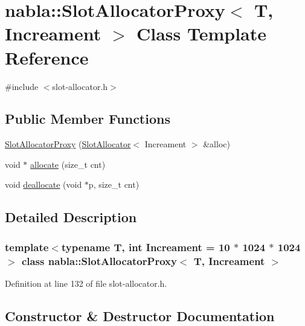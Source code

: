 \hypertarget{classnabla_1_1_slot_allocator_proxy}{}\section{nabla\+::Slot\+Allocator\+Proxy$<$ T, Increament $>$ Class Template Reference}
\label{classnabla_1_1_slot_allocator_proxy}


{\ttfamily \#include $<$slot-\/allocator.\+h$>$}

\subsection*{Public Member Functions}
\begin{DoxyCompactItemize}
\item 
\mbox{\hyperlink{classnabla_1_1_slot_allocator_proxy_ae262939587a0e89fc3df0c112b5452ef}{Slot\+Allocator\+Proxy}} (\mbox{\hyperlink{classnabla_1_1_slot_allocator}{Slot\+Allocator}}$<$ Increament $>$ \&alloc)
\item 
void $\ast$ \mbox{\hyperlink{classnabla_1_1_slot_allocator_proxy_a05daafc13137ba556aa706cda7b06547}{allocate}} (size\+\_\+t cnt)
\item 
void \mbox{\hyperlink{classnabla_1_1_slot_allocator_proxy_aea1e0a1bb27b9ca2130979566a4b4021}{deallocate}} (void $\ast$p, size\+\_\+t cnt)
\end{DoxyCompactItemize}


\subsection{Detailed Description}
\subsubsection*{template$<$typename T, int Increament = 10 $\ast$ 1024 $\ast$ 1024$>$\newline
class nabla\+::\+Slot\+Allocator\+Proxy$<$ T, Increament $>$}



Definition at line 132 of file slot-\/allocator.\+h.



\subsection{Constructor \& Destructor Documentation}
\mbox{\label{classnabla_1_1_slot_allocator_proxy_ae262939587a0e89fc3df0c112b5452ef}} 

